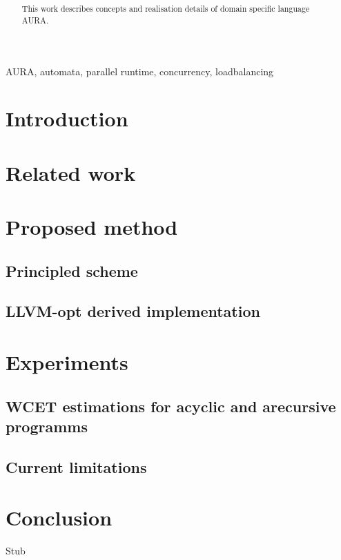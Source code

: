 \documentclass[10pt, conference, compsocconf]{IEEEtran}
\begin{document}
\title{
}

\author{
}


\maketitle
\begin{abstract}
This work describes concepts and realisation details of domain specific
language AURA.

\end{abstract}

\begin{IEEEkeywords}
AURA, automata, parallel runtime, concurrency, loadbalancing
\end{IEEEkeywords}

\section{Introduction}

\section{Related work}
\section{Proposed method}
\subsection{Principled scheme}
\subsection{LLVM-opt derived implementation}
\section{Experiments}
\subsection{WCET estimations for acyclic and arecursive programms}
\subsection{Current limitations}
\section{Conclusion}


\begin{thebibliography}{99}
Stub
\end{thebibliography}
\end{document}
